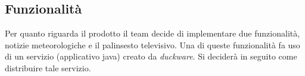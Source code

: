 	\subsection{Funzionalità}
	\label{sec:funzionalità}
	Per quanto riguarda il prodotto il team decide di implementare due funzionalità, notizie meteorologiche e il palinsesto televisivo. Una di queste funzionalità fa uso di un servizio (applicativo java) creato da \textit{duckware}. Si deciderà in seguito come distribuire tale servizio.